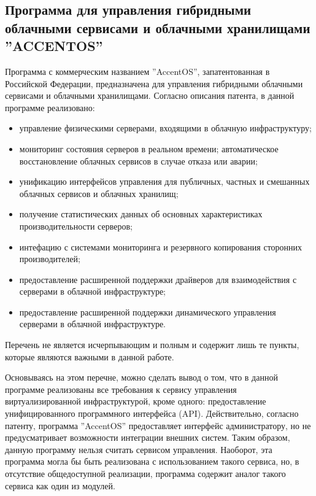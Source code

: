 \subsection{Программа для управления гибридными облачными сервисами и облачными хранилищами
''ACCENTOS''}
Программа с коммерческим названием ''AccentOS'', запатентованная в Российской Федерации\cite{accentos}, предназначена для управления гибридными облачными сервисами и облачными хранилищами.
Согласно описания патента, в данной программе реализовано:
\begin{itemize}
    \item управление физическими серверами, входящими в облачную инфраструктуру; 
    \item мониторинг состояния серверов в реальном времени; автоматическое восстановление облачных сервисов в случае отказа или аварии;
    \item унификацию интерфейсов управления для публичных, частных и смешанных облачных сервисов и облачных хранилищ;
    \item получение статистических данных об основных характеристиках производительности серверов;
    \item интефацию с системами мониторинга и резервного копирования сторонних производителей;
    \item предоставление расширенной поддержки драйверов для взаимодействия с серверами в облачной инфраструктуре;
    \item предоставление расширенной поддержки динамического управления серверами в облачной инфраструктуре.
\end{itemize}
Перечень не является исчерпывающим и полным и содержит лишь те пункты, которые являются важными в данной работе.

Основываясь на этом перечне, можно сделать вывод о том, что в данной программе реализованы все требования к сервису управления виртуализированной инфраструктурой, кроме одного: предоставление унифицированного программного интерфейса (API).
Действительно, согласно патенту, программа ''AccentOS'' предоставляет интерфейс администратору, но не предусматривает возможности интеграции внешних систем.
Таким образом, данную программу нельзя считать сервисом управления.
Наоборот, эта программа могла бы быть реализована с использованием такого сервиса, но, в отсутствие общедоступной реализации, программа содержит аналог такого сервиса как один из модулей.
